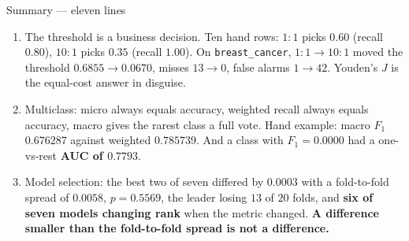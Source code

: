 \documentclass[aspectratio=169]{beamer}
\begin{document}
\begin{frame}[shrink=17]{Summary --- eleven lines}
\begin{enumerate}
      for $54$ true ones --- one alert in twenty-two. \textbf{The PR baseline
      is the prevalence, not $0.5$.}
    \item The threshold is a business decision. Ten hand rows: $1\!:\!1$ picks
      $0.60$ (recall $0.80$), $10\!:\!1$ picks $0.35$ (recall $1.00$). On
      \texttt{breast\_cancer}, $1\!:\!1 \to 10\!:\!1$ moved the threshold
      $0.6855 \to 0.0670$, misses $13 \to 0$, false alarms $1 \to 42$.
      Youden's $J$ is the equal-cost answer in disguise.
    \item Multiclass: micro always equals accuracy, weighted recall always
      equals accuracy, macro gives the rarest class a full vote. Hand example:
      macro $F_1$ $0.676287$ against weighted $0.785739$. And a class with
      $F_1 = 0.0000$ had a one-vs-rest \textbf{AUC of $0.7793$}.
    \item Model selection: the best two of seven differed by $\mathbf{0.0003}$
      with a fold-to-fold spread of $\mathbf{0.0058}$, $p = 0.5569$, the
      leader losing $13$ of $20$ folds, and \textbf{six of seven models
      changing rank} when the metric changed. \textbf{A difference smaller
      than the fold-to-fold spread is not a difference.}
  \end{enumerate}
\end{frame}
\end{document}

